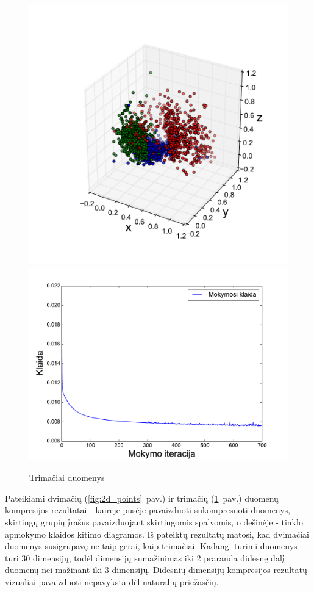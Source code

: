 \documentclass{VUMIFPSbakalaurinis}
\begin{document}
\begin{figure}
	\includegraphics[scale=0.5]{pics/points_3d}
	\includegraphics[scale=0.5]{pics/points_3d_progress}
	\caption{Trimačiai duomenys}
	\label{fig:3d_points}
\end{figure}

Pateikiami dvimačių (\ref{fig:2d_points}~pav.) ir trimačių (\ref{fig:3d_points}~pav.) duomenų kompresijos rezultatai - kairėje pusėje pavaizduoti sukompresuoti duomenys, skirtingų grupių įrašus pavaizduojant skirtingomis spalvomis, o dešinėje - tinklo apmokymo klaidos kitimo diagramos.
Iš pateiktų rezultatų matosi, kad dvimačiai duomenys susigrupavę ne taip gerai, kaip trimačiai.
Kadangi turimi duomenys turi 30 dimensijų, todėl dimensijų sumažinimas iki 2 praranda didesnę dalį duomenų nei mažinant iki 3 dimensijų.
Didesnių dimensijų kompresijos rezultatų vizualiai pavaizduoti nepavyksta dėl natūralių priežasčių.
\end{document}
